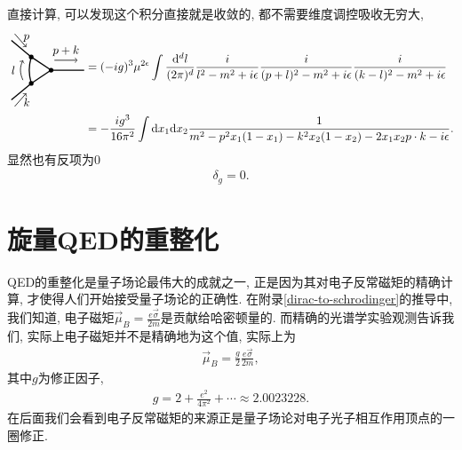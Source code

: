 直接计算, 可以发现这个积分直接就是收敛的, 都不需要维度调控吸收无穷大,
\begin{align}
    \begin{tikzpicture}[line width=1pt, baseline=(current bounding box.center)]
        \coordinate (v1) at (-0.4, 0.4);
        \coordinate (v2) at (-0.4, -0.4);
        \coordinate (v3) at (0.2, 0);
        \draw (-1.0, 0.9) -- (v1);
        \draw (-1.0, -0.9) -- (v2);
        \draw (v3) -- (1.2, 0);
        \draw (v1) to[bend right=15] (v2);
        \draw (v1) -- (v3);
        \draw (v2) -- (v3);
        \filldraw (v1) circle (1.5pt);
        \filldraw (v2) circle (1.5pt);
        \filldraw (v3) circle (1.5pt);
        \draw[->, semithick] (-0.9, 1.1) -- (-0.55, 0.7) node[midway, right, xshift=-1pt, yshift=2pt] {$p$};
        \draw[->, semithick] (-0.9, -1.1) -- (-0.55, -0.7) node[midway, right, xshift=-1pt, yshift=-2pt] {$k$};
        \draw[->, semithick] (0.3, 0.3) -- (1.0, 0.3) node[midway, above] {$p+k$};
        \draw[->, semithick] (-0.65, -0.3) to[bend left=25] (-0.65, 0.3);
        \node[left] at (-0.75, 0) {$l$};
    \end{tikzpicture}
    &=(-ig)^3\mu^{2\epsilon}\int \frac{\d^d l}{(2\pi)^d}\frac{i}{l^2 - m^2 + i\epsilon} \frac{i}{(p+l)^2 - m^2 + i\epsilon} \frac{i}{(k-l)^2 - m^2 + i\epsilon}\\
    &=-\frac{ig^3}{16\pi^2}\int\dx_1\dx_2\frac1{m^2-p^2x_1(1-x_1)-k^2x_2(1-x_2)-2x_1x_2p\cdot k-i\epsilon}.
\end{align}
显然也有反项为$0$
\begin{align}
    \delta_g=0.
\end{align}

\section{旋量QED的重整化}
QED的重整化是量子场论最伟大的成就之一, 正是因为其对电子反常磁矩的精确计算, 才使得人们开始接受量子场论的正确性. 在附录\ref{dirac-to-schrodinger}的推导中, 我们知道, 电子磁矩$\vec\mu_B=\frac{e\vec\sigma}{2m}$是贡献给哈密顿量的. 而精确的光谱学实验观测告诉我们, 实际上电子磁矩并不是精确地为这个值, 实际上为
\begin{align}
    \vec\mu_B=\frac g2\frac{e\vec\sigma}{2m},
\end{align}
其中$g$为修正因子,
\begin{align}
    g=2+\frac{e^2}{4\pi^2}+\cdots\approx2.0023228.
\end{align}
在后面我们会看到电子反常磁矩的来源正是量子场论对电子光子相互作用顶点的一圈修正.

